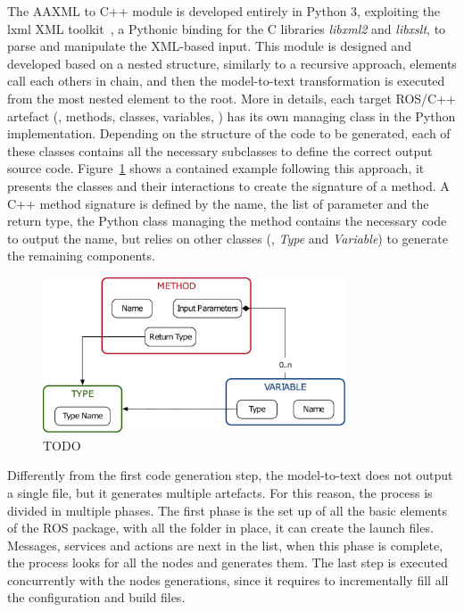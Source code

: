 The AAXML to C++ module is developed entirely in Python 3, exploiting the lxml XML toolkit~\cite{lxml}, a Pythonic binding for the C libraries \textit{libxml2} and \textit{libxslt}, to parse and manipulate the XML-based input. This module is designed and developed based on a nested structure, similarly to a recursive approach, elements call each others in chain, and then the model-to-text transformation is executed from the most nested element to the root. More in details, each target ROS/C++ artefact (\eg, methods, classes, variables, \etc) has its own managing class in the Python implementation. Depending on the structure of the code to be generated, each of these classes contains all the necessary subclasses to define the correct output source code. Figure~\ref{fig:russiandoll} shows a contained example following this approach, it presents the classes and their interactions to create the signature of a method. A C++ method signature is defined by the name, the list of parameter and the return type, the Python class managing the method contains the necessary code to output the name, but relies on other classes (\ie, \textit{Type} and \textit{Variable}) to generate the remaining components.

\begin{figure}[t]
    \centering
    \includegraphics[width=0.8\textwidth]{gfx/russiandoll}
    \caption{TODO}\label{fig:russiandoll}
\end{figure}

Differently from the first code generation step, the model-to-text does not output a single file, but it generates multiple artefacts. For this reason, the process is divided in multiple phases. The first phase is the set up of all the basic elements of the ROS package, with all the folder in place, it can create the launch files. Messages, services and actions are next in the list, when this phase is complete, the process looks for all the nodes and generates them. The last step is executed concurrently with the nodes generations, since it requires to incrementally fill all the configuration and build files.

